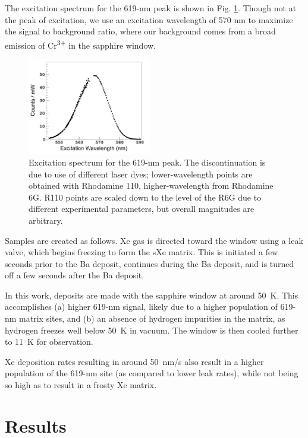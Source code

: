 \documentclass[aps,pra,reprint,superscriptaddress]{revtex4-1}
\begin{document}
The excitation spectrum for the 619-nm peak is shown in Fig. \ref{fig:excitspec}.  Though not at the peak of excitation, we use an excitation wavelength of 570 nm to maximize the signal to background ratio, where our background comes from a broad emission of Cr\textsuperscript{3+} in the sapphire window.

\begin{figure}
\includegraphics[width=0.48\textwidth]{figures/excitspec.png}
\caption{Excitation spectrum for the 619-nm peak.  The discontinuation is due to use of different laser dyes; lower-wavelength points are obtained with Rhodamine 110, higher-wavelength from Rhodamine 6G.  R110 points are scaled down to the level of the R6G due to different experimental parameters, but overall magnitudes are arbitrary.}
\label{fig:excitspec}
\end{figure}

Samples are created as follows.  Xe gas is directed toward the window using a leak valve, which begins freezing to form the sXe matrix.  This is initiated a few seconds prior to the Ba deposit, continues during the Ba deposit, and is turned off a few seconds after the Ba deposit.  

In this work, deposits are made with the sapphire window at around 50~K. This accomplishes (a) higher 619-nm signal, likely due to a higher population of 619-nm matrix sites, and (b) an absence of hydrogen impurities in the matrix, as hydrogen freezes well below 50~K in vacuum.  The window is then cooled further to 11~K for observation.  

Xe deposition rates resulting in around {\color{blue}50~nm/s} also result in a higher population of the 619-nm site (as compared to lower leak rates), while not being so high as to result in a frosty Xe matrix.

\section{Results}
\label{sec:results}
\end{document}
